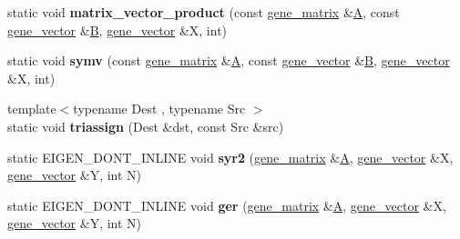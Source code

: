 \begin{DoxyCompactItemize}
static void {\bfseries matrix\+\_\+vector\+\_\+product} (const \hyperlink{group___core___module_class_eigen_1_1_matrix}{gene\+\_\+matrix} \&\hyperlink{group___core___module_class_eigen_1_1_matrix}{A}, const \hyperlink{group___core___module_class_eigen_1_1_matrix}{gene\+\_\+vector} \&\hyperlink{group___core___module_class_eigen_1_1_matrix}{B}, \hyperlink{group___core___module_class_eigen_1_1_matrix}{gene\+\_\+vector} \&X, int)
\item 
\mbox{\label{classeigen3__interface_a5c5c3badd214379d6ed58d1cd161c8c9}} 
static void {\bfseries symv} (const \hyperlink{group___core___module_class_eigen_1_1_matrix}{gene\+\_\+matrix} \&\hyperlink{group___core___module_class_eigen_1_1_matrix}{A}, const \hyperlink{group___core___module_class_eigen_1_1_matrix}{gene\+\_\+vector} \&\hyperlink{group___core___module_class_eigen_1_1_matrix}{B}, \hyperlink{group___core___module_class_eigen_1_1_matrix}{gene\+\_\+vector} \&X, int)
\item 
\mbox{\label{classeigen3__interface_a31493192fd6d65ad4439ff34b179e659}} 
{\footnotesize template$<$typename Dest , typename Src $>$ }\\static void {\bfseries triassign} (Dest \&dst, const Src \&src)
\item 
\mbox{\label{classeigen3__interface_aee05e2263ef2aae953203af40f65c797}} 
static E\+I\+G\+E\+N\+\_\+\+D\+O\+N\+T\+\_\+\+I\+N\+L\+I\+NE void {\bfseries syr2} (\hyperlink{group___core___module_class_eigen_1_1_matrix}{gene\+\_\+matrix} \&\hyperlink{group___core___module_class_eigen_1_1_matrix}{A}, \hyperlink{group___core___module_class_eigen_1_1_matrix}{gene\+\_\+vector} \&X, \hyperlink{group___core___module_class_eigen_1_1_matrix}{gene\+\_\+vector} \&Y, int N)
\item 
\mbox{\label{classeigen3__interface_aaba801db7f10c7decb881a765030b10e}} 
static E\+I\+G\+E\+N\+\_\+\+D\+O\+N\+T\+\_\+\+I\+N\+L\+I\+NE void {\bfseries ger} (\hyperlink{group___core___module_class_eigen_1_1_matrix}{gene\+\_\+matrix} \&\hyperlink{group___core___module_class_eigen_1_1_matrix}{A}, \hyperlink{group___core___module_class_eigen_1_1_matrix}{gene\+\_\+vector} \&X, \hyperlink{group___core___module_class_eigen_1_1_matrix}{gene\+\_\+vector} \&Y, int N)
\item 
\mbox{\label{classeigen3__interface_af063f7eeab14f4eef3bb5788c165310a}} 

\end{DoxyCompactItemize}

